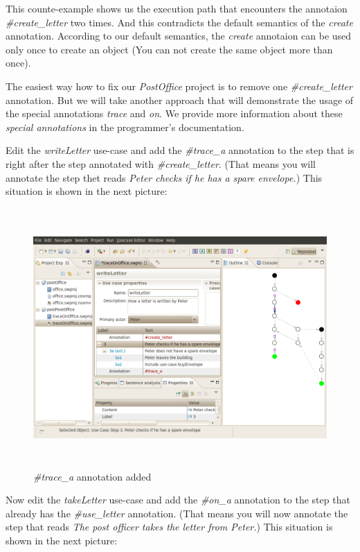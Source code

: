 This counte-example shows us the execution path that encounters the annotaion \emph{\#create\_letter} two times. And this contradicts
the default semantics of the \emph{create} annotation. According to our default semantics, the \emph{create} annotaion can be used
only once to create an object (You can not create the same object more than once). 

The easiest way how to fix our \emph{PostOffice} project is to remove one \emph{\#create\_letter} annotation. But we will take another
approach that will demonstrate the usage of the special annotations \emph{trace} and \emph{on}. We provide more information about
these \emph{special annotations} in the programmer's documentation.

Edit the \emph{writeLetter} use-case and add the \emph{\#trace\_a} annotation to the step that is right after the step annotated with
\emph{\#create\_letter}. (That means you will annotate the step thet reads \emph{Peter checks if he has a spare envelope.}) This
situation is shown in the next picture:

\begin{figure}[ht]
  \centering
  \includegraphics[height=280pt]{images/reprotoolTraceA}
  \caption{\emph{\#trace\_a} annotation added}
  \label{fig:reprotoolTraceA}
\end{figure}

\newpage

Now edit the \emph{takeLetter} use-case and add the \emph{\#on\_a} annotation to the step that already has the \emph{\#use\_letter}
annotation. (That means you will now annotate the step that reads \emph{The post officer takes the letter from Peter.}) This situation
is shown in the next picture:

